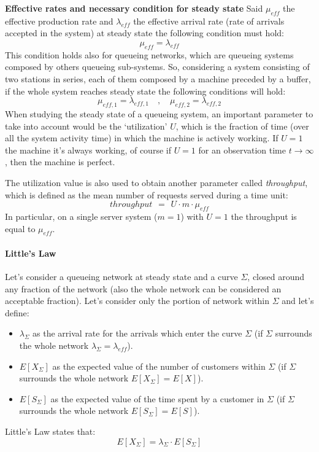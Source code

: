 \documentclass[12pt,a4paper]{article}
\begin{document}
\bigskip\noindent
\textbf{Effective rates and necessary condition for steady state }
Said $\mu_{eff}$ the effective production rate and $\lambda_{eff}$ the effective arrival rate (rate of arrivals accepted in the system) at steady state the following condition must hold:
$$
\mu_{eff}=\lambda_{eff}
$$
This condition holds also for queueing networks, which are queueing systems composed by others queueing sub-systems. So, considering a system consisting of two stations in series, each of them composed by a machine preceded by a buffer, if the whole system reaches steady state the following conditions will hold:
$$
\mu_{eff,1}=\lambda_{eff,1}
\quad
,
\quad
\mu_{eff,2}=\lambda_{eff,2}
$$
When studying the steady state of a queueing system, an important parameter to take into account would be the `utilization' $U$, which is the fraction of time (over all the system activity time) in which the machine is actively working. If $U=1$ the machine it's always working, of course if $U=1$ for an observation time $t\rightarrow \infty$, then the machine is perfect. 

\bigskip\noindent
The utilization value is also used to obtain another parameter called \emph{throughput}, which is defined as the mean number of requests served during a time unit:
$$
throughput\hspace{5pt}=\hspace{5pt}U\cdot m\cdot \mu_{eff}
$$
In particular, on a single server system ($m = 1$) with $U=1$ the throughput is equal to $\mu_{eff}$.
\newpage

\paragraph{Little's Law}
Let's consider a queueing network at steady state and a curve $\Sigma$, closed around any fraction of the network (also the whole network can be considered an acceptable fraction). Let's consider only the portion of network within $\Sigma$ and let's define:
\begin{itemize}
\item $\lambda_{\Sigma}$ as the arrival rate for the arrivals which enter the curve $\Sigma$ (if $\Sigma$ surrounds the whole network $\lambda_{\Sigma}=\lambda_{eff}$).
\item $E[X_{\Sigma}]$ as the expected value of the number of customers within $\Sigma$ (if $\Sigma$ surrounds the whole network $E[X_{\Sigma}]=E[X]$).
\item $E[S_{\Sigma}]$ as the expected value of the time spent by a customer in $\Sigma$ (if $\Sigma$ surrounds the whole network $E[S_{\Sigma}]=E[S]$).
\end{itemize}
Little's Law states that:
\begin{equation*}
E[X_{\Sigma}]=\lambda_{\Sigma}\cdot E[S_{\Sigma}]
\end{equation*}
\end{document}

